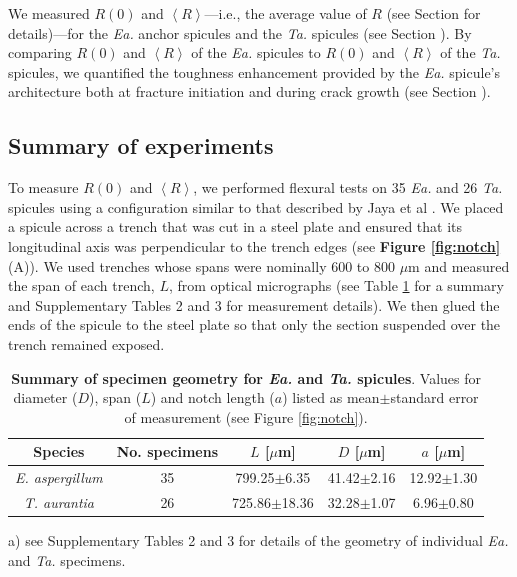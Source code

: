 \documentclass[12pt,onecolumn]{article}
\makeatletter
\DeclareRobustCommand*{\nameref}[1]{%
      \emph{\myorg@nameref{#1}}%
    }%
\newcommand{\TA}{\textit{Ta.\@}\xspace}
\newcommand{\EA}{\textit{Ea.\@}\xspace}
\newcommand{\ra}[1]{\renewcommand{\arraystretch}{#1}}
\makeatother
\begin{document}
\begin{bibunit}
We measured $R(0)$ and $\left< R \right>$---i.e., the average value of $R$ (see Section \nameref{sec:avgR} for details)---for the \EA anchor spicules and the \TA spicules (see Section \nameref{sec:res}). By comparing $R(0)$ and $\left< R \right>$ of the \EA spicules to $R(0)$ and $\left< R \right>$ of the \TA spicules, we quantified the toughness enhancement provided by the \EA spicule's architecture both at fracture initiation and during crack growth (see Section \nameref{sec:Rcomp}).

\subsection*{Summary of experiments}
To measure $R(0)$ and $\left< R \right>$, we performed flexural tests on 35 \EA and 26 \TA spicules using a configuration similar to that described  by Jaya et al \cite{jaya2014crack,jaya2015can}. We placed a spicule across a trench that was cut in a steel plate and ensured that its longitudinal axis was perpendicular to the trench edges (see {\bf Figure \ref{fig:notch}} (A)). We used trenches whose spans were nominally 600 to 800 $\mu$m and measured the span of each trench, $L$, from optical micrographs (see Table \ref{tab:spiculegeom} for a summary and Supplementary Tables 2 and 3 for measurement details). We then glued the ends of the spicule to the steel plate so that only the section suspended over the trench remained exposed. 
%
\begin{table}
\centering
\ra{1.25}
\begin{threeparttable}[t]
\begin{tabular}{ccccc}
\toprule
Species & No. specimens & $L$ [$\mu$m] & $D$ [$\mu$m] & $a$ [$\mu$m]\\
\midrule
\textit{E. aspergillum} & 35 & 799.25$\pm$6.35 & 41.42$\pm$2.16 & 12.92$\pm$1.30\\
\textit{T. aurantia} & 26 & 725.86$\pm$18.36 & 32.28$\pm$1.07 & 6.96$\pm$0.80\\
\bottomrule
\end{tabular}
\begin{tablenotes}
\item[a)] {\footnotesize see Supplementary Tables 2 and 3 for details of the geometry of individual \EA and \TA specimens.}
\end{tablenotes}
\end{threeparttable}
\caption{\textbf{Summary of specimen geometry for \EA and \TA spicules}. Values for diameter ($D$), span ($L$) and notch length ($a$) listed as mean$\pm$standard error of measurement (see Figure \ref{fig:notch}).}
\label{tab:spiculegeom}
\end{table}


\end{bibunit}
\end{document}
